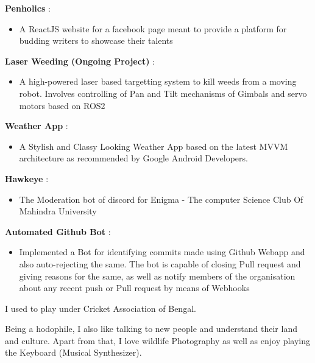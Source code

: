 \documentclass[a4paper, oneside, 12pt]{article}
\makeatletter
\def\vhrulefill#1{\leavevmode\leaders\hrule\@height#1\hfill \kern\z@}
\makeatother
\begin{document}
\begin{flushleft}

    \color{gray}{\vhrulefill{1.5pt}}
  
  \vspace{2mm}
  \color{black}
  \textbf{Penholics }: 
    \begin{itemize}[label =]
      \item A ReactJS website for a facebook page meant to provide a platform for budding writers to showcase their talents
    \end{itemize}
  \textbf{Laser Weeding (Ongoing Project) }: 
    \begin{itemize}[label =]
      \item A high-powered laser based targetting system to kill weeds from a moving robot. Involves controlling of Pan and Tilt mechanisms of Gimbals and servo motors based on ROS2 
    \end{itemize}

  \textbf{Weather App }: 
    \begin{itemize}[label =]
      \item A Stylish and Classy Looking Weather App based on the latest MVVM architecture as recommended by Google Android Developers.
    \end{itemize}
  
  \textbf{Hawkeye }: 
    \begin{itemize}[label =]
      \item The Moderation bot of discord for Enigma - The computer Science Club Of Mahindra University
    \end{itemize}
  
  \textbf{Automated Github Bot }: 
    \begin{itemize}[label =]
      \item Implemented a Bot for identifying commits made using Github Webapp and also auto-rejecting the same. The bot is capable of closing Pull request and giving reasons for the same, as well as notify members of the organisation about any recent push or Pull request by means of Webhooks
    \end{itemize}
\end{flushleft}

\pagebreak



\begin{flushleft}
  \color{gray}{\vhrulefill{1.5pt}}
\vspace{2mm}

\color{black}

I used to play under Cricket Association of Bengal.

Being a hodophile, I also like talking to new people and understand their land and culture.
Apart from that, I love wildlife Photography as well as enjoy playing the Keyboard (Musical Synthesizer).

\end{flushleft}
\end{document}
